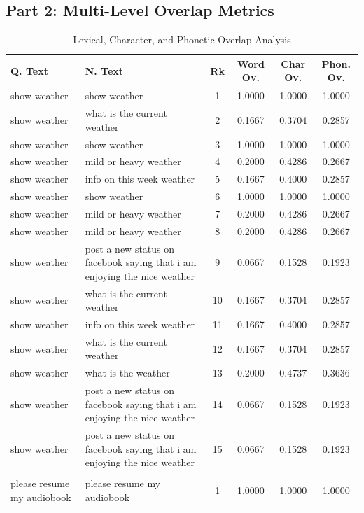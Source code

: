 \subsection*{Part 2: Multi-Level Overlap Metrics}
{\small
\begin{longtable}{p{4.0cm} p{4.0cm} c ccc}
\caption{Lexical, Character, and Phonetic Overlap Analysis} \\
\toprule
\textbf{Q. Text} & \textbf{N. Text} & \textbf{Rk} & \textbf{Word Ov.} & \textbf{Char Ov.} & \textbf{Phon. Ov.} \\
\midrule
show weather & show weather & 1 & 1.0000 & 1.0000 & 1.0000 \\
show weather & what is the current weather & 2 & 0.1667 & 0.3704 & 0.2857 \\
show weather & show weather & 3 & 1.0000 & 1.0000 & 1.0000 \\
show weather & mild or heavy weather & 4 & 0.2000 & 0.4286 & 0.2667 \\
show weather & info on this week weather & 5 & 0.1667 & 0.4000 & 0.2857 \\
show weather & show weather & 6 & 1.0000 & 1.0000 & 1.0000 \\
show weather & mild or heavy weather & 7 & 0.2000 & 0.4286 & 0.2667 \\
show weather & mild or heavy weather & 8 & 0.2000 & 0.4286 & 0.2667 \\
show weather & post a new status on facebook saying that i am enjoying the nice weather & 9 & 0.0667 & 0.1528 & 0.1923 \\
show weather & what is the current weather & 10 & 0.1667 & 0.3704 & 0.2857 \\
show weather & info on this week weather & 11 & 0.1667 & 0.4000 & 0.2857 \\
show weather & what is the current weather & 12 & 0.1667 & 0.3704 & 0.2857 \\
show weather & what is the weather & 13 & 0.2000 & 0.4737 & 0.3636 \\
show weather & post a new status on facebook saying that i am enjoying the nice weather & 14 & 0.0667 & 0.1528 & 0.1923 \\
show weather & post a new status on facebook saying that i am enjoying the nice weather & 15 & 0.0667 & 0.1528 & 0.1923 \\
\midrule
 &  &  &  &  & \\ %
\midrule
please resume my audiobook & please resume my audiobook & 1 & 1.0000 & 1.0000 & 1.0000 \\

\end{longtable}}
